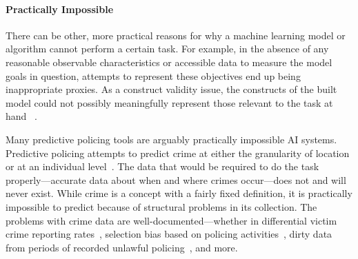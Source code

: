 \documentclass[acmconf,manuscript,screen,natbib=true]{acmart}
\newcommand{\ignore}[2]{\hspace{0in}#2}
\begin{document}
\paragraph{Practically Impossible}
There can be other, more practical reasons for why a machine learning model or algorithm cannot perform a certain task. For example, in the absence of any reasonable observable characteristics or accessible data to measure the model goals in question, attempts to represent these objectives end up being inappropriate proxies. As a construct validity issue, the constructs of the built model could not possibly meaningfully represent those relevant to the task at hand ~\cite{Jacobs2021-og,Jacobs2021-rk}.

\ignore{Criminal justice offers a wide variety of such practically impossible tasks, either through the lack of availability of the data.}Many predictive policing tools are arguably %
practically impossible AI systems. Predictive policing attempts to predict crime at either the granularity of location or at an individual level~\cite{Ferguson2016-bs}. The data that would be required to do the task properly---accurate data about when and where crimes occur---does not and will never exist. While crime is a concept with a fairly fixed definition, it is practically impossible to predict because of structural problems in its collection. The problems with crime data are well-documented---whether in differential victim crime reporting rates~\cite{Akpinar2021-fb}, selection bias based on policing activities~\cite{Lum2016-hz,Ensign2017-vi}, dirty data from periods of recorded unlawful policing~\cite{Richardson2019-cn}, and more. 
\ignore{
\asnote{What work is this discussion of thick concepts doing? Can we delete? Why is it in this subsection while it says they are conceptually impossible? Also, is it necessarily accurate that thick concept = conceptually impossible?}
Some of these are thick concepts -- concepts that describe and evaluate simultaneously -- which ideally are co-produced but are typically based on the values judgement of researchers~\cite{Alexandrova_undated-mx}. Common focus areas of criminal justice algorithms like "likelihood of flight","public safety", or "dangerousness" represent thick concepts. A universal or legally valid version of these constructs may not be possible~\cite{Mayson_dangdefendants,Slobogin2003-ou,Gouldin_undated-oc, Stevenson2021-fr}, making them  potentially \emph{conceptually} impossible. }
\end{document}
